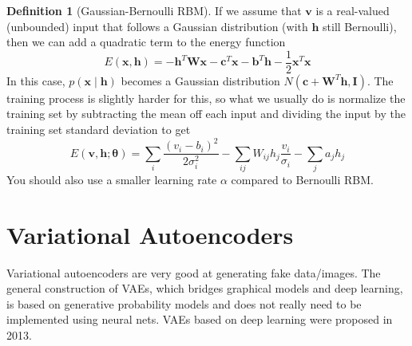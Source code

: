 \documentclass{article}
\theoremstyle{definition}
\theoremstyle{remark}
\theoremstyle{definition}
\newtheorem{definition}{Definition}[section]
\begin{document}
\begin{definition}[Gaussian-Bernoulli RBM] 
If we assume that $\mathbf{v}$ is a real-valued (unbounded) input that follows a Gaussian distribution (with $\mathbf{h}$ still Bernoulli), then we can add a quadratic term to the energy function 
\[E(\mathbf{x}, \mathbf{h}) = - \mathbf{h}^T \mathbf{W} \mathbf{x} - \mathbf{c}^T \mathbf{x} - \mathbf{b}^T \mathbf{h} - \frac{1}{2} \mathbf{x}^T \mathbf{x}\]
In this case, $p(\mathbf{x} \mid \mathbf{h})$ becomes a Gaussian distribution $N(\mathbf{c} + \mathbf{W}^T \mathbf{h}, \mathbf{I})$. The training process is slightly harder for this, so what we usually do is normalize the training set by subtracting the mean off each input and dividing the input by the training set standard deviation to get  
\[E(\mathbf{v}, \mathbf{h}; \boldsymbol{\theta}) = \sum_i \frac{(v_i - b_i)^2}{2 \sigma_i^2} - \sum_{ij} W_{ij} h_j \frac{v_i}{\sigma_i} - \sum_j a_j h_j\]
You should also use a smaller learning rate $\alpha$ compared to Bernoulli RBM. 
\end{definition} 


\section{Variational Autoencoders}

Variational autoencoders are very good at generating fake data/images. The general construction of VAEs, which bridges graphical models and deep learning, is based on generative probability models and does not really need to be implemented using neural nets. VAEs based on deep learning were proposed in 2013. 
\end{document}
